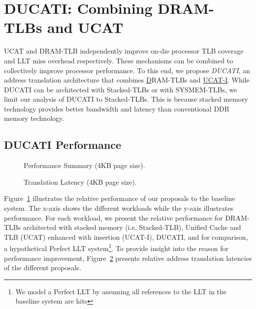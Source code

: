 \section{DUCATI: Combining DRAM-TLBs \newline and UCAT}
\label{sec:DUCATI}

\noindent UCAT and DRAM-TLB independently improve on-die processor TLB
coverage and LLT miss overhead respectively. These mechanisms can be
combined to collectively improve processor performance. To this end,
we propose {\em DUCATI}, an address translation architecture that
combines \underline{D}RAM-TLBs and \underline{UCAT-I}. While DUCATI
can be architected with Stacked-TLBs or with SYSMEM-TLBs, we limit our
analysis of DUCATI to Stacked-TLBs. This is because stacked memory
technology provides better bandwidth and latency than
conventional DDR memory technology.

\subsection{DUCATI Performance}

\begin{figure}[tp] 
\vspace{-0.0 in} \centering
\centerline{}

\caption{\small Performance Summary (4KB page size).\normalsize}
\label{fig:summary_4k_pages_perf} 
\vspace{0.1 in}
\end{figure}

\begin{figure}[tp] 
\vspace{0.1 in} \centering
\centerline{}

\caption{\small Translation Latency (4KB page size).\normalsize}
\label{fig:summary_4k_pages_lat} 
\vspace{-0. in}
\end{figure}

\noindent Figure~\ref{fig:summary_4k_pages_perf} illustrates the
relative performance of our proposals to the baseline system. The
x-axis shows the different workloads while the y-axis illustrates
performance. For each workload, we present the relative performance
for DRAM-TLBs architected with stacked memory (i.e. Stacked-TLB),
Unified Cache and TLB (UCAT) enhanced with insertion (UCAT-I), DUCATI,
and for comparison, a hypothetical Perfect LLT system\footnote{We
model a Perfect LLT by assuming all references to the LLT in the
baseline system are hits}. To provide insight into the reason for
performance improvement, Figure~\ref{fig:summary_4k_pages_lat}
presents relative address translation latencies of the different
proposals. 

